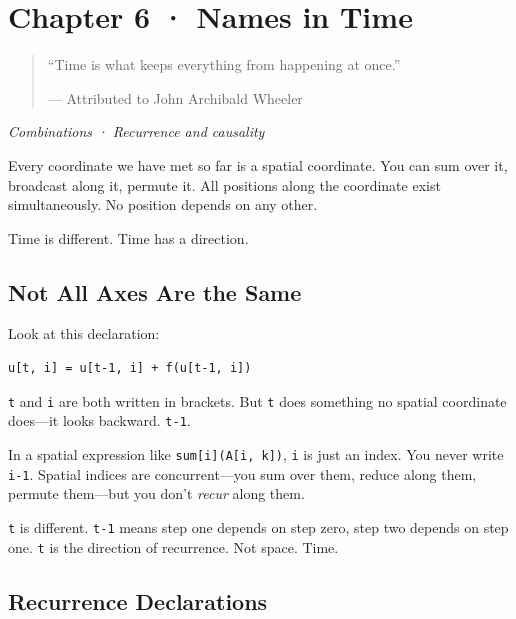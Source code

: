 \documentclass[11pt,titlepage]{article}
\begin{document}
\newpage

\hypertarget{chapter-6-names-in-time}{%
\section{Chapter 6 · Names in Time}\label{chapter-6-names-in-time}}

\begin{quote}
``Time is what keeps everything from happening at once.''

--- Attributed to John Archibald Wheeler
\end{quote}

\emph{Combinations · Recurrence and causality}

\vspace{2em}

Every coordinate we have met so far is a spatial coordinate. You can sum
over it, broadcast along it, permute it. All positions along the
coordinate exist simultaneously. No position depends on any other.

Time is different. Time has a direction.

\vspace{2em}

\hypertarget{not-all-axes-are-the-same}{%
\subsection{Not All Axes Are the Same}\label{not-all-axes-are-the-same}}

Look at this declaration:

\begin{verbatim}
u[t, i] = u[t-1, i] + f(u[t-1, i])
\end{verbatim}

\texttt{t} and \texttt{i} are both written in brackets. But \texttt{t}
does something no spatial coordinate does---it looks backward.
\texttt{t-1}.

In a spatial expression like \texttt{sum{[}i{]}(A{[}i,\ k{]})},
\texttt{i} is just an index. You never write \texttt{i-1}. Spatial
indices are concurrent---you sum over them, reduce along them, permute
them---but you don't \emph{recur} along them.

\texttt{t} is different. \texttt{t-1} means step one depends on step
zero, step two depends on step one. \texttt{t} is the direction of
recurrence. Not space. Time.

\vspace{2em}

\hypertarget{recurrence-declarations}{%
\subsection{Recurrence Declarations}\label{recurrence-declarations}}
\end{document}
